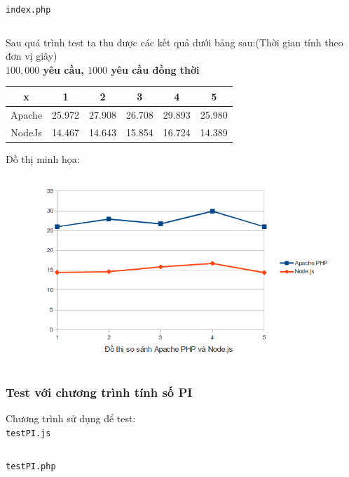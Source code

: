 \texttt{index.php}
	\begin{framed}
		\inputminted[tabsize=4,linenos=true]{php}{index.php}
	\end{framed}

Sau quá trình test ta thu được các kết quả dưới bảng sau:(Thời gian tính theo đơn vị giây)\\
\textbf{$100,000$ yêu cầu, $1000$ yêu cầu đồng thời} \\
	\begin{tabular}{|c|c|c|c|c|c|}
		\hline
		x & 1 & 2 & 3 & 4 & 5 \\
		\hline
		Apache & 25.972 & 27.908 & 26.708 & 29.893 & 25.980 \\
		\hline
		NodeJs & 14.467 & 14.643 & 15.854 & 16.724 & 14.389
		\\ \hline
	\end{tabular}
\newpage

Đồ thị minh họa:\\
	\begin{figure}[-h]
		\centering
		\includegraphics[scale=0.6]{1_1.png}
	\end{figure}

\subsubsection*{Test với chương trình tính số PI}
	Chương trình sử dụng để test:\\
\texttt{testPI.js}
		\begin{framed}
			\inputminted[tabsize=4, linenos=true]{javascript}{testPI.js}
		\end{framed}

\texttt{testPI.php}
		\begin{framed}
			\inputminted[tabsize=4, linenos=true]{php}{testPi.php}
		\end{framed}

